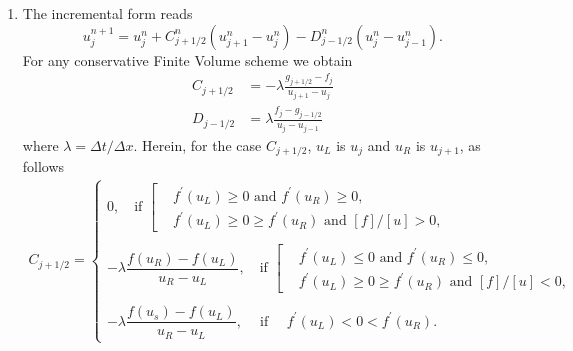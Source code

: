 \documentclass[12pt]{article}
\begin{document}
\begin{enumerate}
	\item The incremental form reads
	      \begin{equation*}
		      \boxed{
		      u_j^{n+1} = u_j^n +C_{j+1/2}^n (u_{j+1}^n-u_j^n) - D_{j-1/2}^n (u_j^n-u_{j-1}^n).
		      }
	      \end{equation*}
	      For any conservative Finite Volume scheme we obtain
	      \begin{align*}
		      C_{j+1/2} & = - \lambda \frac{g_{j+1/2}-f_j}{u_{j+1}-u_j}  \\
		      D_{j-1/2} & =  \lambda \frac{f_j-g_{j-1/2}}{u_{j}-u_{j-1}}
	      \end{align*}
	      where $\lambda = \Delta t/ \Delta x$.
	      Herein, for the case $C_{j+1/2}$, $u_L$ is $u_j$ and $u_R$ is $u_{j+1}$, as follows
	      \begin{align*}
		      C_{j+1/2}
		      =
		      \begin{cases}
			      0, \quad  \text{if }
			      \left[
			      \begin{aligned}
				       & f^\prime(u_L) \geq 0 \text{ and } f^\prime(u_R) \geq 0,         \\
				       & f^\prime(u_L) \geq 0 \geq f^\prime(u_R) \text{ and } [f]/[u]>0,
			      \end{aligned}
			      \right.
			      \\
			      \\
			      - \lambda \dfrac{f(u_R) - f(u_L)}{u_R-u_L},
			      \quad  \text{if }
			      \left[
			      \begin{aligned}
				       & f^\prime(u_L) \leq 0 \text{ and } f^\prime(u_R) \leq 0,         \\
				       & f^\prime(u_L) \geq 0 \geq f^\prime(u_R) \text{ and } [f]/[u]<0,
			      \end{aligned}
			      \right.
			      \\
			      \\
			      - \lambda \dfrac{f(u_s) - f(u_L)}{u_R-u_L}, \quad \  \text{if } \quad
			      f^\prime(u_L) < 0 <  f^\prime(u_R).
			      \quad
		      \end{cases}
	      \end{align*}
	      

\end{enumerate}
\end{document}
